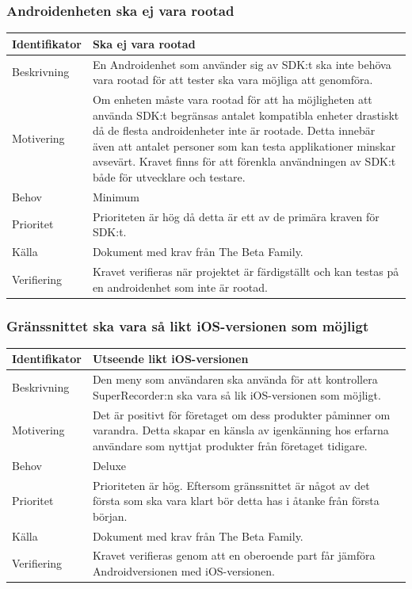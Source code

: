 \subsubsection{Androidenheten ska ej vara rootad}
\label{subsubsec:rootkrav}
\begin{tabular}{ | p{65pt} | p{300pt} |}
  \hline
  Identifikator &
  Ska ej vara rootad
  \\ \hline
  Beskrivning & 
  En Androidenhet som använder sig av SDK:t ska inte behöva vara rootad för att tester ska vara möjliga att genomföra.
  \\ \hline
  Motivering &
  Om enheten måste vara rootad för att ha möjligheten att använda SDK:t begränsas antalet kompatibla enheter drastiskt då de flesta androidenheter inte är rootade. Detta innebär även att antalet personer som kan testa applikationer minskar avsevärt. Kravet finns för att förenkla användningen av SDK:t både för utvecklare och testare.
  \\ \hline
  Behov &
  Minimum
  \\ \hline
  Prioritet &
  Prioriteten är hög då detta är ett av de primära kraven för SDK:t.
  \\ \hline
  Källa &
  Dokument med krav från The Beta Family.
  \\ \hline
  Verifiering &
  Kravet verifieras när projektet är färdigställt och kan testas på en androidenhet som inte är rootad.
  \\ \hline
\end{tabular}

\subsubsection{Gränssnittet ska vara så likt iOS-versionen som möjligt}
\begin{tabular}{ | p{65pt} | p{300pt} |}
  \hline
  Identifikator &
  Utseende likt iOS-versionen
  \\ \hline
  Beskrivning & 
  Den meny som användaren ska använda för att kontrollera SuperRecorder:n ska vara så lik iOS-versionen som möjligt.
  \\ \hline
  Motivering &
  Det är positivt för företaget om dess produkter påminner om varandra. Detta skapar en känsla av igenkänning hos erfarna användare som nyttjat produkter från företaget tidigare.
  \\ \hline
  Behov &
  Deluxe
  \\ \hline
  Prioritet &
  Prioriteten är hög. Eftersom gränssnittet är något av det första som ska vara klart bör detta has i åtanke från första början.
  \\ \hline
  Källa &
  Dokument med krav från The Beta Family.
  \\ \hline
  Verifiering &
  Kravet verifieras genom att en oberoende part får jämföra Androidversionen med iOS-versionen.
  \\ \hline
\end{tabular}

